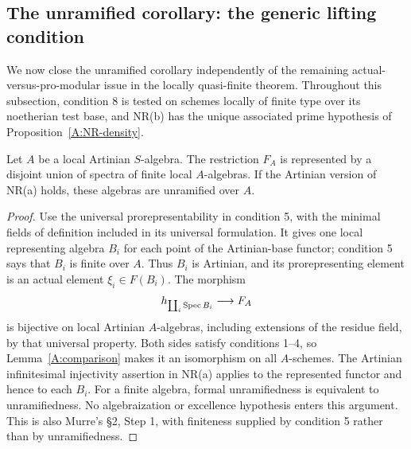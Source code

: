 \subsection{The unramified corollary: the generic lifting condition}

We now close the unramified corollary independently of the remaining
actual-versus-pro-modular issue in the locally quasi-finite theorem.
Throughout this subsection, condition 8 is tested on schemes locally of
finite type over its noetherian test base, and NR(b) has the unique
associated prime hypothesis of Proposition~\ref{A:NR-density}.

\begin{lemma}\label{A:artinian-base}
Let $A$ be a local Artinian $S$-algebra. The restriction $F_A$ is
represented by a disjoint union of spectra of finite local $A$-algebras.
If the Artinian version of NR(a) holds, these algebras are unramified
over $A$.
\end{lemma}
\begin{proof}
Use the universal prorepresentability in condition 5, with the
minimal fields of definition included in its universal formulation.
It gives one local representing algebra $B_i$ for each point of the
Artinian-base functor; condition 5 says that $B_i$ is finite over $A$.
Thus $B_i$ is Artinian, and its prorepresenting element is an actual
element $\xi_i\in F(B_i)$. The morphism
\[
 h_{\coprod_i\operatorname{Spec} B_i}\longrightarrow F_A
\]
is bijective on local Artinian $A$-algebras, including extensions of
the residue field, by that universal property. Both sides satisfy
conditions 1--4, so Lemma~\ref{A:comparison} makes it an isomorphism
on all $A$-schemes. The Artinian infinitesimal injectivity assertion
in NR(a) applies to the represented functor and hence to each $B_i$.
For a finite algebra, formal unramifiedness is equivalent to
unramifiedness. No algebraization or excellence hypothesis enters
this argument. This is also Murre's \S2, Step 1, with finiteness
supplied by condition 5 rather than by unramifiedness.
\end{proof}

